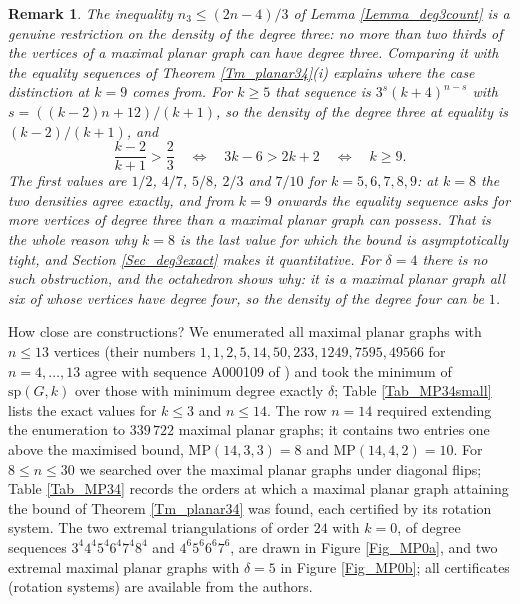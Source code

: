 \documentclass[12pt,a4paper]{article}%
\newtheorem{remark}[theorem]{Remark}
\begin{document}
\begin{remark}
\label{Rem_peel}The inequality $n_{3}\leq (2n-4)/3$ of Lemma \ref{Lemma_deg3count} is a genuine
restriction on the density of the degree
three: no more than two thirds of the vertices of a maximal planar graph can have
degree three. Comparing it with the equality sequences of Theorem
\ref{Tm_planar34}(i) explains where the case distinction at $k=9$ comes from.
For $k\geq 5$ that sequence is $3^{s}(k+4)^{n-s}$ with $s=((k-2)n+12)/(k+1)$, so
the density of the degree three at equality is $(k-2)/(k+1)$, and
\[
\frac{k-2}{k+1}>\frac{2}{3}\quad \Longleftrightarrow \quad 3k-6>2k+2\quad
\Longleftrightarrow \quad k\geq 9.
\]
The first values are $1/2$, $4/7$, $5/8$, $2/3$ and $7/10$ for
$k=5,6,7,8,9$: at $k=8$ the two densities agree exactly, and from $k=9$ onwards
the equality sequence asks for more vertices of degree three than a
maximal planar graph can possess. That is the whole reason why $k=8$ is the last value
for which the bound is asymptotically tight, and Section \ref{Sec_deg3exact}
makes it quantitative. For $\delta =4$ there is no such obstruction, and the
octahedron shows why: it is a maximal planar graph all six of whose vertices have
degree four, so the density of the degree four can be $1$.
\end{remark}



How close are constructions? We enumerated all maximal planar graphs with $n\leq 13$ vertices
(their numbers $1,1,2,5,14,50,233,1249,7595,49566$ for $n=4,\ldots ,13$ agree with sequence
A000109 of \cite{OEIS}) and took the minimum of $\mathrm{sp}(G,k)$ over those with minimum degree
exactly $\delta $; Table \ref{Tab_MP34small} lists the exact values for $k\leq 3$ and $n\leq 14$. The row $n=14$ required extending the
enumeration to $339\,722$ maximal planar graphs; it contains two entries one above the maximised bound,
$\mathrm{MP}(14,3,3)=8$ and $\mathrm{MP}(14,4,2)=10$. For
$8\leq n\leq 30$ we searched over the maximal planar graphs under diagonal flips; Table \ref{Tab_MP34}
records the orders at which a maximal planar graph attaining the bound of Theorem \ref{Tm_planar34} was
found, each certified by its rotation system. The two extremal triangulations of order $24$ with
$k=0$, of degree sequences $3^{4}4^{4}5^{4}6^{4}7^{4}8^{4}$ and $4^{6}5^{6}6^{6}7^{6}$, are drawn in Figure
\ref{Fig_MP0a}, and two extremal maximal planar graphs with $\delta =5$ in Figure \ref{Fig_MP0b}; all certificates
(rotation systems) are
available from the authors.
\end{document}
